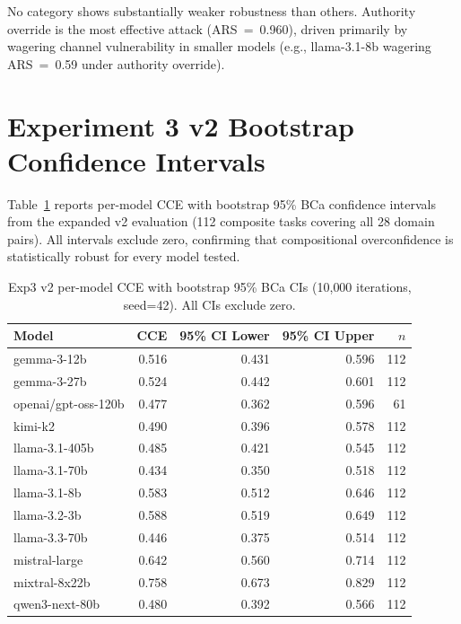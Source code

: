 \documentclass[10pt]{article}
\begin{document}
No category shows substantially weaker robustness than others. Authority override is the most effective attack (ARS~=~0.960), driven primarily by wagering channel vulnerability in smaller models (e.g., llama-3.1-8b wagering ARS~=~0.59 under authority override).

\section{Experiment 3 v2 Bootstrap Confidence Intervals}
\label{app:exp3v2}

Table~\ref{tab:exp3v2-ci} reports per-model CCE with bootstrap 95\% BCa confidence intervals from the expanded v2 evaluation (112 composite tasks covering all 28 domain pairs). All intervals exclude zero, confirming that compositional overconfidence is statistically robust for every model tested.

\begin{table}[h]
\centering
\caption{Exp3 v2 per-model CCE with bootstrap 95\% BCa CIs (10{,}000 iterations, seed=42). All CIs exclude zero.}
\label{tab:exp3v2-ci}
\small
\begin{tabular}{lrrrr}
\toprule
Model & CCE & 95\% CI Lower & 95\% CI Upper & $n$ \\
\midrule
gemma-3-12b     & 0.516 & 0.431 & 0.596 & 112 \\
gemma-3-27b     & 0.524 & 0.442 & 0.601 & 112 \\
openai/gpt-oss-120b & 0.477 & 0.362 & 0.596 &  61 \\
kimi-k2         & 0.490 & 0.396 & 0.578 & 112 \\
llama-3.1-405b  & 0.485 & 0.421 & 0.545 & 112 \\
llama-3.1-70b   & 0.434 & 0.350 & 0.518 & 112 \\
llama-3.1-8b    & 0.583 & 0.512 & 0.646 & 112 \\
llama-3.2-3b    & 0.588 & 0.519 & 0.649 & 112 \\
llama-3.3-70b   & 0.446 & 0.375 & 0.514 & 112 \\
mistral-large   & 0.642 & 0.560 & 0.714 & 112 \\
mixtral-8x22b   & 0.758 & 0.673 & 0.829 & 112 \\
qwen3-next-80b  & 0.480 & 0.392 & 0.566 & 112 \\
\bottomrule
\end{tabular}
\end{table}
\end{document}
